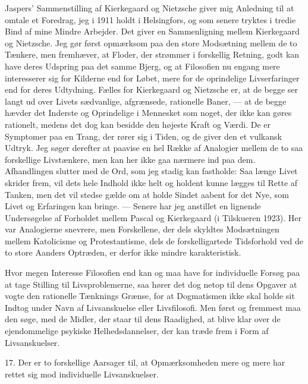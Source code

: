 \documentclass[12pt]{article}
\newcommand{\opage}[1]{\marginnote{\footnotesize\textit{[#1]}}}
\begin{document}
Jaspers' Sammenstilling af Kierkegaard og Nietzsche giver mig
Anledning til at omtale et Foredrag, jeg i 1911 holdt i Helsingfors,
og som senere tryktes i tredie Bind af mine \guillemotright{}Mindre Arbejder\guillemotleft{}. Det
giver en Sammenligning mellem Kierkegaard og Nietzsche. Jeg gør først
opmærksom paa den store Modsætning mellem de to Tænkere, men
fremhæver, at Floder, der strømmer i forskellig Retning, godt kan have
deres Udspring paa det samme Bjerg, og at Filosofien nu engang mere
interesserer sig for Kilderne end for Løbet, mere for de oprindelige
Livserfaringer end for deres Udtydning. Fælles for Kierkegaard og
Nietzsche er, at de begge ser langt ud over Livets sædvanlige,
afgrænsede, rationelle Baner, --- at de begge hævder det Inderste og
Oprindelige i Mennesket som noget, der ikke kan gøres rationelt,
medens det dog kan besidde den højeste Kraft og Værdi. De er
Symptomer paa en Trang, der rører sig i Tiden, og de giver den et
vulkansk Udtryk. Jeg søger derefter at paavise en hel Række af
Analogier mellem de to saa forskellige Livstænkere, men kan her ikke
gaa nærmere ind paa dem. Afhandlingen slutter med de Ord, som jeg
stadig kan fastholde: Saa længe Livet skrider frem, vil dets hele
Indhold ikke helt og holdent kunne lægges til Rette af Tanken, men det
vil stedse gælde om at holde Sindet aabent for det Nye, som Livet og
Erfaringen kan bringe. --- Senere har jeg anstillet en lignende
Undersøgelse af Forholdet mellem
\opage{52}Pascal og Kierkegaard (i \guillemotright{}Tilskueren\guillemotleft{} 1923). Her var
Analogierne snevrere, men Forskellene, der dels skyldtes Modsætningen
mellem Katolicisme og Protestantisme, dels de forskelligartede
Tidsforhold ved de to store Aanders Optræden, er derfor ikke mindre
karakteristisk.

Hvor megen Interesse Filosofien end kan og maa have for individuelle
Forsøg paa at tage Stilling til Livsproblemerne, saa hører det dog
netop til dens Opgaver at vogte den rationelle Tænknings Grænse, for
at Dogmatismen ikke skal holde sit Indtog under Navn af Livsanskuelse
eller Livsfilosofi. Men først og fremmest maa den søge, med de Midler,
der staar til dens Raadighed, at blive klar over de ejendommelige
psykiske Helhedsdannelser, der kan træde frem i Form af
Livsanskuelser.

17. Der er to forskellige Aarsager til, at Opmærksomheden mere og mere
har rettet sig mod individuelle Livsanskuelser.
\end{document}

